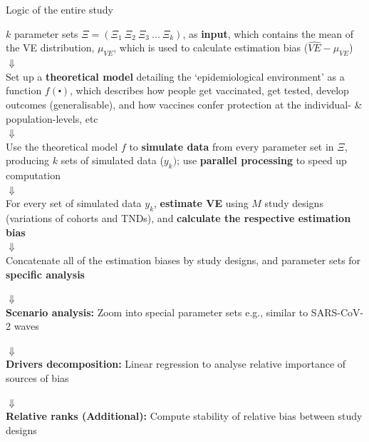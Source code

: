\documentclass[aspectratio=169]{beamer}
\begin{document}
\begin{frame}{Logic of the entire study}
	\centering 
	\footnotesize
	
	$k$ parameter sets $\Xi = (\Xi_1 \ \Xi_2 \ \Xi_3 \ ... \ \Xi_k)$, as \textbf{input}, which contains the mean of the VE distribution, $\mu_{VE}$, which is used to calculate estimation bias ($\widehat{VE} - \mu_{VE}$) \\
	
	$\Downarrow$ \\
	
	Set up a \textbf{theoretical model} detailing the `epidemiological environment' as a function $f(\centerdot)$, which describes how people get vaccinated, get tested, develop outcomes (generalisable), and how vaccines confer protection at the individual- \& population-levels, etc \\
	
	$\Downarrow$ \\ 
	
	Use the theoretical model $f$ to \textbf{simulate data} from every parameter set in $\Xi$, producing $k$ sets of simulated data ($y_k)$; use \textbf{parallel processing} to speed up computation \\ 
	
	$\Downarrow$ \\ 
	
	For every set of simulated data $y_k$, \textbf{estimate VE} using $M$ study designs (variations of cohorts and TNDs), and \textbf{calculate the respective estimation bias} \\
	
	$\Downarrow$ \\ 
	
	Concatenate all of the estimation biases by study designs, and parameter sets for \textbf{specific analysis} \\
	
	\begin{minipage}{0.32\linewidth}
		\centering 
		$\Downarrow$ \\ 
		\textbf{Scenario analysis: }Zoom into special parameter sets e.g., similar to SARS-CoV-2 waves
	\end{minipage}
	\begin{minipage}{0.32\linewidth}
		\centering 
		$\Downarrow$ \\ 
		\textbf{Drivers decomposition: }Linear regression to analyse relative importance of sources of bias
	\end{minipage}
	\begin{minipage}{0.32\linewidth}
		\centering 
		$\Downarrow$ \\ 
		\textbf{Relative ranks (Additional): }Compute stability of relative bias between study designs
	\end{minipage}
\end{frame}
\end{document}
